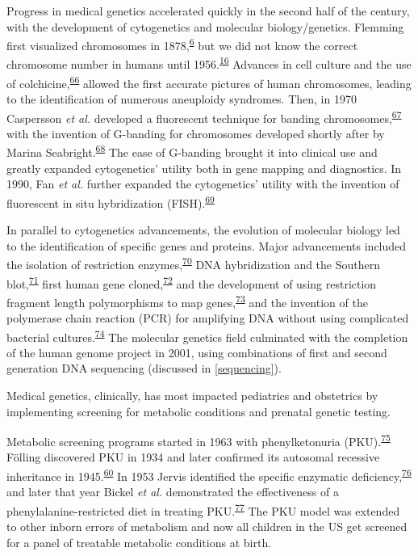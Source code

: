 \documentclass[11pt,letterpaper,oneside]{book}
\begin{document}
Progress in medical genetics accelerated quickly in the second half of the century, with the development of cytogenetics and molecular biology/genetics.
Flemming first visualized chromosomes in 1878,\textsuperscript{\protect\hyperlink{ref-flemming:1878aa}{6}} but we did not know the correct chromosome number in humans until 1956.\textsuperscript{\protect\hyperlink{ref-tjio:1956aa}{16}}
Advances in cell culture and the use of colchicine,\textsuperscript{\protect\hyperlink{ref-levan:1938aa}{66}} allowed the first accurate pictures of human chromosomes, leading to the identification of numerous aneuploidy syndromes.
Then, in 1970 Caspersson \emph{et al.} developed a fluorescent technique for banding chromosomes,\textsuperscript{\protect\hyperlink{ref-caspersson:1970aa}{67}} with the invention of G-banding for chromosomes developed shortly after by Marina Seabright.\textsuperscript{\protect\hyperlink{ref-seabright:1971aa}{68}}
The ease of G-banding brought it into clinical use and greatly expanded cytogenetics' utility both in gene mapping and diagnostics.
In 1990, Fan \emph{et al.} further expanded the cytogenetics' utility with the invention of fluorescent in situ hybridization (FISH).\textsuperscript{\protect\hyperlink{ref-fan:1990aa}{69}}

In parallel to cytogenetics advancements, the evolution of molecular biology led to the identification of specific genes and proteins.
Major advancements included the isolation of restriction enzymes,\textsuperscript{\protect\hyperlink{ref-danna:1971aa}{70}} DNA hybridization and the Southern blot,\textsuperscript{\protect\hyperlink{ref-southern:1975aa}{71}} first human gene cloned,\textsuperscript{\protect\hyperlink{ref-shine:1977aa}{72}} and the development of using restriction fragment length polymorphisms to map genes,\textsuperscript{\protect\hyperlink{ref-botstein:1980aa}{73}} and the invention of the polymerase chain reaction (PCR) for amplifying DNA without using complicated bacterial cultures.\textsuperscript{\protect\hyperlink{ref-mullis:1986aa}{74}}
The molecular genetics field culminated with the completion of the human genome project in 2001, using combinations of first and second generation DNA sequencing (discussed in \ref{sequencing}).

Medical genetics, clinically, has most impacted pediatrics and obstetrics by implementing screening for metabolic conditions and prenatal genetic testing.

Metabolic screening programs started in 1963 with phenylketonuria (PKU).\textsuperscript{\protect\hyperlink{ref-guthrie:1963aa}{75}}
Fölling discovered PKU in 1934 and later confirmed its autosomal recessive inheritance in 1945.\textsuperscript{\protect\hyperlink{ref-harper:2008aa}{60}}
In 1953 Jervis identified the specific enzymatic deficiency,\textsuperscript{\protect\hyperlink{ref-jervis:1953aa}{76}} and later that year Bickel \emph{et al.} demonstrated the effectiveness of a phenylalanine-restricted diet in treating PKU.\textsuperscript{\protect\hyperlink{ref-bickel:1953aa}{77}}
The PKU model was extended to other inborn errors of metabolism and now all children in the US get screened for a panel of treatable metabolic conditions at birth.
\end{document}
